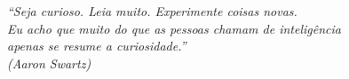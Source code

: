 \begin{epigrafe}
    \vspace*{\fill}
	\begin{flushright}
		\textit{``Seja curioso. Leia muito. Experimente coisas novas.\\ Eu acho que muito do que as pessoas chamam de inteligência\\apenas se resume a curiosidade.''\\ %
		          (Aaron Swartz)}
	\end{flushright}
\end{epigrafe}

